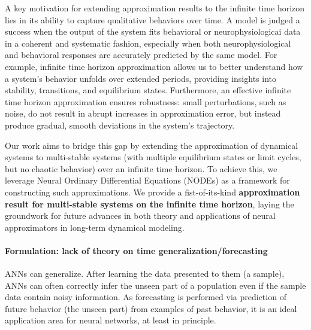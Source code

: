 \documentclass{article}
\theoremstyle{definition}
\theoremstyle{remark}
\newcounter{ct}
\begin{document}
A key motivation for extending approximation results to the infinite time horizon lies in its ability to capture qualitative behaviors over time.
A model is judged a success when the output of the system fits behavioral or neurophysiologicai data in a coherent and systematic fashion, especially when both neurophysiological and behavioral responses are accurately predicted by the same model.
 For example, infinite time horizon approximation allows us to better understand how a system's behavior unfolds over extended periods, providing insights into stability, transitions, and equilibrium states.
 Furthermore, an effective infinite time horizon approximation ensures robustness: small perturbations, such as noise, do not result in abrupt increases in approximation error, but instead produce gradual, smooth deviations in the system's trajectory.



Our work aims to bridge this gap by extending the approximation of dynamical systems to multi-stable systems (with multiple equilibrium states or limit cycles, but no chaotic behavior) over an infinite time horizon. 
To achieve this, we leverage Neural Ordinary Differential Equations (NODEs) as a framework for constructing such approximations.
We provide a fist-of-its-kind \textbf{approximation result for multi-stable systems on the infinite time horizon}, laying the groundwork for future advances in both theory and applications of neural approximators in long-term dynamical modeling.



\paragraph{Formulation: lack of theory on time generalization/forecasting}
ANNs can generalize. After learning the data presented to them (a sample), ANNs can often correctly infer the unseen part of a population even if the sample data contain noisy information. As forecasting is performed via prediction of future behavior (the unseen part) from examples of past behavior, it is an ideal application area for neural networks, at least in principle. \citep{zhang1998forecasting}
\end{document}
